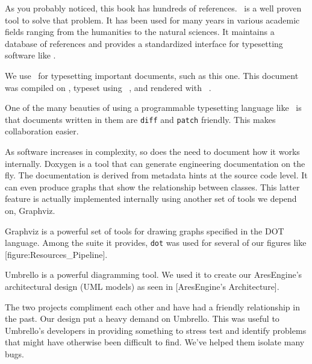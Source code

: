 

\startitemize[4]
\head {\em \BIBTEX}

As you probably noticed, this book has hundreds of references. \BIBTEX\ is a well proven tool to solve that problem. It has been used for many years in various academic fields ranging from the humanities to the natural sciences. It maintains a database of references and provides a standardized interface for typesetting software like \CONTEXT.

\head {\em \CONTEXT}

We use \CONTEXT\ for typesetting important documents, such as this one. This document was compiled on \currentdate, typeset using \CONTEXT\ \contextversion, and rendered with \texenginename\ \texengineversion. 

One of the many beauties of using a programmable typesetting language like \CONTEXT\ is that documents written in them are {\tt diff} and {\tt patch} friendly. This makes collaboration easier.


As software increases in complexity, so does the need to document how it works internally. Doxygen is a tool that can generate engineering documentation on the fly. The documentation is derived from metadata hints at the source code level. It can even produce graphs that show the relationship between classes. This latter feature is actually implemented internally using another set of tools we depend on, Graphviz.


Graphviz is a powerful set of tools for drawing graphs specified in the DOT language. Among the suite it provides, {\tt dot} was used for several of our figures like [figure:Resources_Pipeline].


Umbrello is a powerful diagramming tool. We used it to create our AresEngine's architectural design (UML models) as seen in [AresEngine's Architecture]. 

The two projects compliment each other and have had a friendly relationship in the past. Our design put a heavy demand on Umbrello. This was useful to Umbrello's developers in providing something to stress test and identify problems that might have otherwise been difficult to find. We've helped them isolate many bugs.
\stopitemize

